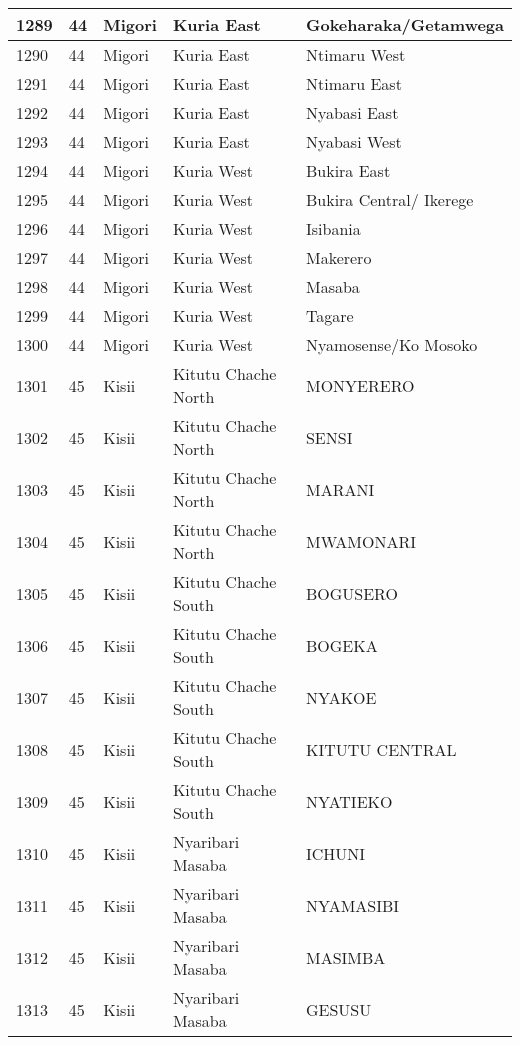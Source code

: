\begin{table}[!ht]
\begin{tabular}{|l|l|l|l|l|}
        1289 & 44 & Migori & Kuria East & Gokeharaka/Getamwega \\ \hline
        1290 & 44 & Migori & Kuria East & Ntimaru West \\ \hline
        1291 & 44 & Migori & Kuria East & Ntimaru East \\ \hline
        1292 & 44 & Migori & Kuria East & Nyabasi East \\ \hline
        1293 & 44 & Migori & Kuria East & Nyabasi West \\ \hline
        1294 & 44 & Migori & Kuria West & Bukira East \\ \hline
        1295 & 44 & Migori & Kuria West & Bukira Central/ Ikerege \\ \hline
        1296 & 44 & Migori & Kuria West & Isibania \\ \hline
        1297 & 44 & Migori & Kuria West & Makerero \\ \hline
        1298 & 44 & Migori & Kuria West & Masaba \\ \hline
        1299 & 44 & Migori & Kuria West & Tagare \\ \hline
        1300 & 44 & Migori & Kuria West & Nyamosense/Ko Mosoko \\ \hline
        1301 & 45 & Kisii & Kitutu Chache North & MONYERERO \\ \hline
        1302 & 45 & Kisii & Kitutu Chache North & SENSI \\ \hline
        1303 & 45 & Kisii & Kitutu Chache North & MARANI \\ \hline
        1304 & 45 & Kisii & Kitutu Chache North & MWAMONARI \\ \hline
        1305 & 45 & Kisii & Kitutu Chache South & BOGUSERO \\ \hline
        1306 & 45 & Kisii & Kitutu Chache South & BOGEKA \\ \hline
        1307 & 45 & Kisii & Kitutu Chache South & NYAKOE \\ \hline
        1308 & 45 & Kisii & Kitutu Chache South & KITUTU CENTRAL \\ \hline
        1309 & 45 & Kisii & Kitutu Chache South & NYATIEKO \\ \hline
        1310 & 45 & Kisii & Nyaribari Masaba & ICHUNI \\ \hline
        1311 & 45 & Kisii & Nyaribari Masaba & NYAMASIBI \\ \hline
        1312 & 45 & Kisii & Nyaribari Masaba & MASIMBA \\ \hline
        1313 & 45 & Kisii & Nyaribari Masaba & GESUSU \\ \hline

\end{tabular}
\end{table}
